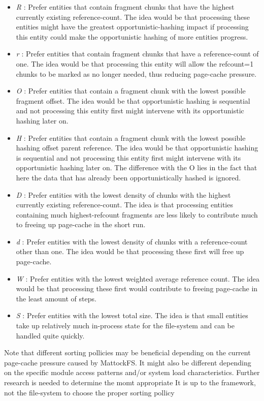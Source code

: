 \begin{itemize}
\item \emph{R} : Prefer entities that contain fragment chunks that have the highest currently existing reference-count. The idea would be that processing these entities might have the greatest opportunistic-hashing impact if processing this entity could make the opportunistic hashing of more entities progress.
\item \emph{r} : Prefer entities that contain fragment chunks that have a reference-count of one. The idea would be that processing this entity will allow the refcount=1 chunks to be marked as no longer needed, thus reducing page-cache pressure.
\item \emph{O} : Prefer entities that contain a fragment chunk with the lowest possible fragment offset. The idea would be that opportunistic hashing is sequential and not processing this entity first might intervene with its opportunistic hashing later on.
\item \emph{H} : Prefer entities that contain a fragment chunk with the lowest possible hashing offset parent reference. The idea would be that opportunistic hashing is sequential and not processing this entity first might intervene with its opportunistic hashing later on. The difference with the O lies in the fact that here the data that has already been opportunistically hashed is ignored.
\item \emph{D} : Prefer entities with the lowest density of chunks with the highest currently existing reference-count. The idea is that processing entities containing much highest-refcount fragments are less likely to contribute much to freeing up page-cache in the short run.
\item \emph{d} : Prefer entities with the lowest density of chunks with  a reference-count other than one. The idea would be that processing these first will free up page-cache.
\item \emph{W} : Prefer entities with the lowest weighted average reference count. The idea would be that processing these first would contribute to freeing page-cache in the least amount of steps.
\item \emph{S} : Prefer entities with the lowest total size. The idea is that small entities take up relatively much in-process state for the file-system and can be handled quite quickly.
\end{itemize}
Note that different sorting pollicies may be beneficial depending on the current page-cache pressure caused by MattockFS\@.
It might also be different depending on the specific module access patterns and/or system load characteristics. Further research is needed to determine the momt appropriate It is up to the framework, not the file-system to choose the proper sorting pollicy 
